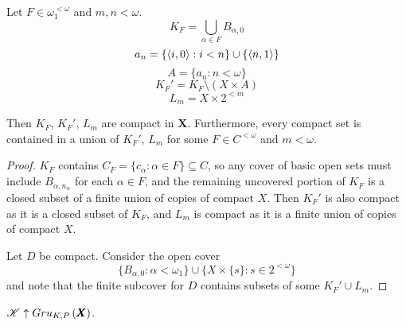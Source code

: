\begin{defn}
  Let $F\in \omega_1^{<\omega}$ and $m,n<\omega$.
  \[
    K_F = \bigcup_{\alpha \in F} B_{\alpha,0}
  \]
  \[
    a_n = \{\langle i,0\rangle:i<n\}\cup\{\langle n,1\rangle\}
  \]
  \[
    A = \{a_n : n<\omega\}
  \]
  \[
    K_F' = K_F \setminus (X \times A)
  \]
  \[
    L_m = X \times 2^{<m}
  \]
\end{defn}

\begin{lem}
  Then $K_F$, $K_F'$, $L_m$ are compact in $\pmb X$.
  Furthermore, every compact set is contained in a union of $K_F'$, $L_m$
  for some $F\in C^{<\omega}$ and $m<\omega$.
\end{lem}

\begin{proof}
  $K_F$ contains $C_F=\{c_\alpha: \alpha\in F\}\subseteq C$, so any
  cover of basic open sets must include $B_{\alpha,n_\alpha}$ for each
  $\alpha\in F$, and the remaining uncovered portion of $K_F$ is a closed
  subset of a finite union of copies of compact $X$. Then $K_F'$ is also
  compact as it is a closed subset of $K_F$, and $L_m$ is compact as it
  is a finite union of copies of compact $X$.

  Let $D$ be compact. Consider the open cover
    \[
      \{
        B_{\alpha,0}
      :
        \alpha<\omega_1
      \}
      \cup
      \{
        X\times\{s\}
      :
        s\in 2^{<\omega}
      \}
    \]
  and note that the finite subcover for $D$ contains subsets of some
  $K_F' \cup L_m$.
\end{proof}

\begin{thm}
  $\mathscr{K}\uparrow Gru_{K,P}\left({\pmb X}\right)$.
\end{thm}

